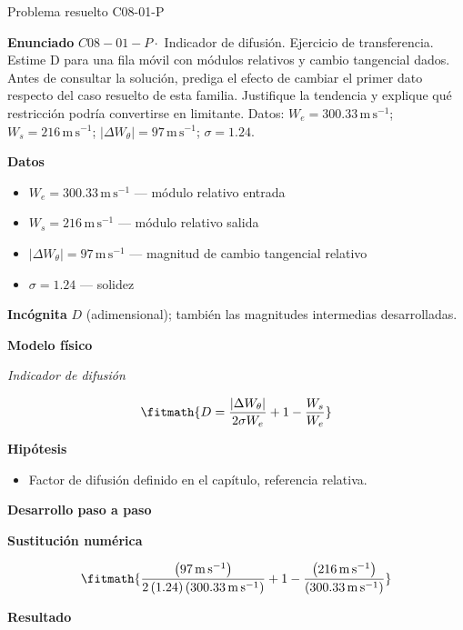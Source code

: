 \documentclass[10pt,openany]{book}
\begin{document}
\begin{studiumworked}{Problema resuelto C08-01-P}


\noindent\textbf{Enunciado}
\(C08-01-P \cdot\) Indicador de difusión. Ejercicio de transferencia. Estime D para una fila móvil con módulos relativos y cambio tangencial dados. Antes de consultar la solución, prediga el efecto de cambiar el primer dato respecto del caso resuelto de esta familia. Justifique la tendencia y explique qué restricción podría convertirse en limitante. Datos: \(W_e=300.33\, \mathrm{m}\,\mathrm{s}^{-1}\); \(W_s=216\, \mathrm{m}\,\mathrm{s}^{-1}\); \(|\Delta W_\theta|=97\, \mathrm{m}\,\mathrm{s}^{-1}\); \(\sigma=1.24\).

\noindent\textbf{Datos}
\begin{itemize}
\item $W_e = 300.33\,\mathrm{m}\,\mathrm{s}^{-1}$ — módulo relativo entrada
\item $W_s = 216\,\mathrm{m}\,\mathrm{s}^{-1}$ — módulo relativo salida
\item $|\Delta W_\theta| = 97\,\mathrm{m}\,\mathrm{s}^{-1}$ — magnitud de cambio tangencial relativo
\item $\sigma = 1.24$ — solidez
\end{itemize}

\noindent\textbf{Incógnita}
$D$ (adimensional); también las magnitudes intermedias desarrolladas.

\noindent\textbf{Modelo físico}

\noindent\textit{Indicador de difusión}

\[
\fitmath{D=\frac{|\Delta W_\theta|}{2 \sigma W_e} + 1 - \frac{W_s}{W_e}}
\]

\noindent\textbf{Hipótesis}
\begin{itemize}
\item Factor de difusión definido en el capítulo, referencia relativa.
\end{itemize}

\noindent\textbf{Desarrollo paso a paso}



\noindent\textbf{Sustitución numérica}

\[
\fitmath{\frac{\left(97\,\mathrm{m}\,\mathrm{s}^{-1}\right)}{2 \left(1.24\right) \left(300.33\,\mathrm{m}\,\mathrm{s}^{-1}\right)} + 1 - \frac{\left(216\,\mathrm{m}\,\mathrm{s}^{-1}\right)}{\left(300.33\,\mathrm{m}\,\mathrm{s}^{-1}\right)}}
\]

\noindent\textbf{Resultado}


\end{studiumworked}
\end{document}
